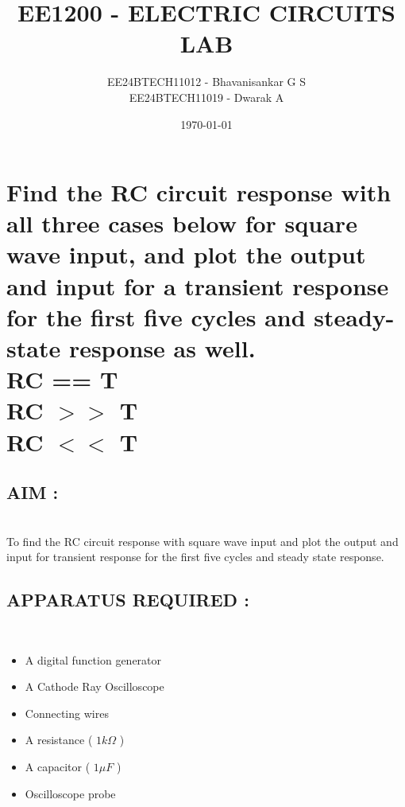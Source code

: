 \documentclass[12pt]{article}
\title{\textbf{EE1200 - ELECTRIC CIRCUITS LAB}}
\author{EE24BTECH11012 - Bhavanisankar G S \\ EE24BTECH11019 - Dwarak A}
\date{\today}
\begin{document}
\maketitle
\thispagestyle{empty} %

\newpage

\section{Find the RC circuit response with all three cases below for square wave input, and plot the output and input for a transient response for the first five cycles and steady-state response as well. \\
	RC == T \\ RC $>>$ T \\ RC $<<$ T}

\subsection{\textbf{AIM :}} \\
To find the RC circuit response with square wave input and plot the output and input for transient response for the first five cycles and steady state response.

\subsection{\textbf{APPARATUS REQUIRED :}} \\
\begin{itemize}
\item A digital function generator
\item A Cathode Ray Oscilloscope
\item Connecting wires
\item A resistance ( $1 k\Omega$ )
\item A capacitor ( $1 \mu F$ )
\item Oscilloscope probe
\end{itemize}
\end{document}
